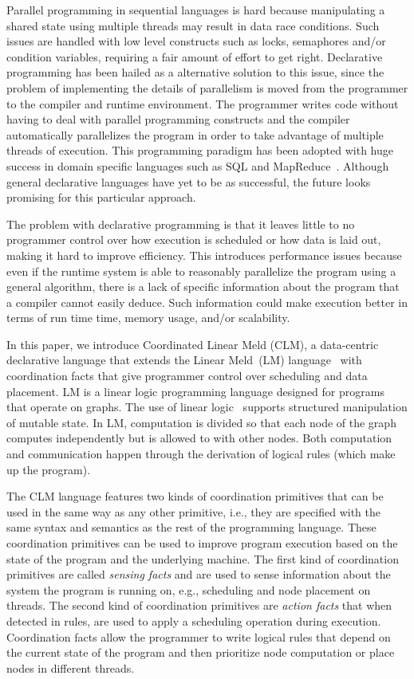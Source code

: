 Parallel programming in sequential languages is hard because manipulating a
shared state using multiple threads may result in data race conditions. Such
issues are handled with low level constructs such as locks, semaphores and/or condition
variables, requiring a fair amount of effort to get right.  Declarative
programming has been hailed as a alternative solution to this issue, since the problem of
implementing the details of parallelism is moved from the programmer to the
compiler and runtime environment. The programmer writes code without having to deal with
parallel programming constructs and the compiler automatically parallelizes the
program in order to take advantage of multiple threads of execution.  This
programming paradigm has been adopted with huge success in domain specific
languages such as SQL and MapReduce~\cite{Dean:2008:MSD:1327452.1327492}.
Although general declarative languages have yet to be as successful, the future
looks promising for this particular approach.

The problem with declarative programming is that it leaves little to no
programmer control over how execution is scheduled or how data is laid out,
making it hard to improve efficiency. This introduces
performance issues because even if the runtime system is able to
reasonably parallelize the program using a general algorithm, there
is a lack of specific information about the program that a compiler
cannot easily deduce. Such information could make execution better in
terms of run time time, memory usage, and/or scalability.

In this paper, we introduce Coordinated Linear Meld (CLM), a data-centric declarative
language that extends the Linear Meld~(LM)
language~\cite{cruz-iclp14,cruz-ppdp14} with coordination facts that give
programmer control over scheduling and data placement. LM is a linear logic
programming language designed for programs that operate on graphs.  The use
of linear logic~\cite{girard-87} supports structured manipulation of mutable
state. In LM, computation is divided so that each node of the graph computes
independently but is allowed to  with other nodes.  Both
computation and communication happen through the derivation of logical rules
(which make up the program).

The CLM language features two kinds of coordination primitives that can be used in the same
way as any other primitive, i.e., they are specified with the same
syntax and semantics as the rest of the programming language. These coordination
primitives can be used to improve program execution based on the state of the
program and the underlying machine. The first kind of coordination primitives are
called \emph{sensing facts} and are used to sense information about the system
the program is running on, e.g., scheduling and node placement on threads. The
second kind of coordination primitives are \emph{action facts} that when detected in
rules, are used to apply a scheduling operation during execution. Coordination
facts allow the programmer to write logical rules that depend on the current
state of the program and then prioritize node computation or place nodes in
different threads.

